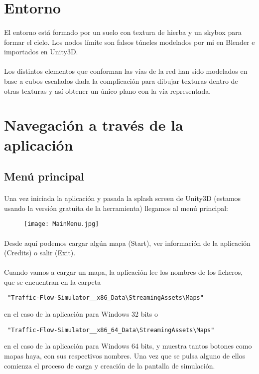 \section{Entorno}

	\paragraph{}
	El entorno está formado por un suelo con textura de hierba y un skybox para formar el cielo. Los nodos límite son falsos túneles modelados por mi en Blender \cite{Blender_web} e importados en Unity3D.
	\paragraph{}
	Los distintos elementos que conforman las vías de la red han sido modelados en base a cubos escalados dada la complicación para dibujar texturas dentro de otras texturas y así obtener un único plano con la vía representada.
	
\section{Navegación a través de la aplicación}
	
	\subsection{Menú principal}
	\paragraph{}
	Una vez iniciada la aplicación y pasada la splash screen de Unity3D (estamos usando la versión gratuita de la herramienta) llegamos al menú principal:
	
	\begin{figure}[H]
		\centering
			\texttt{[image: MainMenu.jpg]}
	\end{figure}
	
	\paragraph{}
	Desde aquí podemos cargar algún mapa (Start), ver información de la aplicación (Credits) o salir (Exit).

	\paragraph{}	
	Cuando vamos a cargar un mapa, la aplicación lee los nombres de los ficheros, que se encuentran en la carpeta
	\begin{verbatim} "Traffic-Flow-Simulator__x86_Data\StreamingAssets\Maps" \end{verbatim} en el caso de la aplicación para Windows 32 bits o 				\begin{verbatim} "Traffic-Flow-Simulator__x86_64_Data\StreamingAssets\Maps" \end{verbatim} en el caso de la aplicación para Windows 64 bits, y muestra tantos botones como mapas haya, con sus respectivos nombres. Una vez que se pulsa alguno de ellos comienza el proceso de carga y creación de la pantalla de simulación.
	
